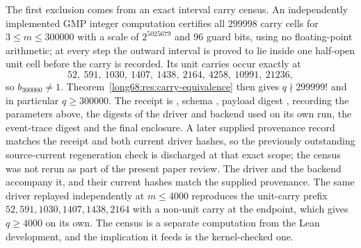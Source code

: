 \documentclass[11pt]{article}
\begin{document}
The first exclusion comes from an exact interval carry census.  An
independently implemented GMP integer computation certifies all $299998$
carry cells for $3\le m\le300000$ with a scale of $2^{5025679}$ and $96$
guard bits, using no floating-point arithmetic; at every step the outward
interval is proved to lie inside one half-open unit cell before the carry is
recorded.  Its unit carries occur exactly at
\[
 52,\ 591,\ 1030,\ 1407,\ 1438,\ 2164,\ 4258,\ 10991,\ 21236,
\]
so $b_{300000}\ne1$.  Theorem~\ref{long68:res:carry-equivalence} then gives
$q\nmid299999!$ and in particular $q\ge300000$.  The receipt is
, schema
, payload digest
,
recording the parameters above, the digests of the driver and backend used on
its own run, the event-trace digest and the final enclosure.  A later supplied
provenance record matches the receipt and both current driver hashes, so the
previously outstanding source-current regeneration check is discharged at
that exact scope; the census was not rerun as part of the present paper review.
The driver
 and the backend
 accompany it, and their
current hashes match the supplied provenance.  The same driver replayed independently at
$m\le4000$ reproduces the unit-carry prefix $52,591,1030,1407,1438,2164$ with
a non-unit carry at the endpoint, which gives $q\ge4000$ on its own.  The
census is a separate computation from the Lean development, and the
implication it feeds is the kernel-checked one.
\end{document}
